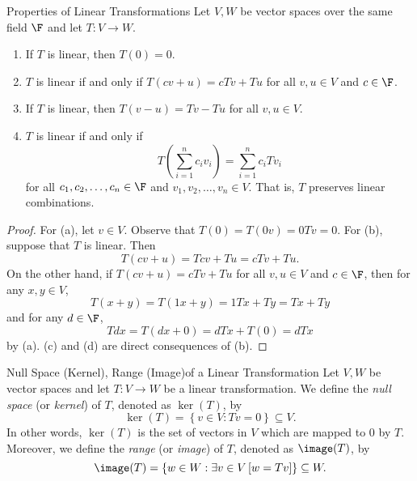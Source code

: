 \documentclass[linearalgebra]{subfiles}
\begin{document}
    \begin{prop}{Properties of Linear Transformations}
        Let $V, W$ be vector spaces over the same field $\F$ and let $T:V\to W$.
        \begin{enumerate}
            \item If $T$ is linear, then $T(0)=0$.
            \item $T$ is linear if and only if $T(cv+u)=cTv+Tu$ for all $v,u\in V$ and $c\in\F$.
            \item If $T$ is linear, then $T(v-u)=Tv-Tu$ for all $v,u\in V$.
            \item $T$ is linear if and only if
                \begin{equation*}
                    T\left( \sum^{n}_{i=1} c_iv_i \right) = \sum^{n}_{i=1} c_iTv_i
                \end{equation*}
                for all $c_1,c_2,\ldots,c_n\in\F$ and $v_1,v_2,\ldots,v_n\in V$. That is, $T$ preserves linear combinations.
        \end{enumerate}
    \end{prop}

    \begin{proof}
        For (a), let $v\in V$. Observe that $T(0) = T(0v) = 0Tv = 0$. For (b), suppose that $T$ is linear. Then
        \begin{equation*}
            T(cv+u) = Tcv + Tu = cTv + Tu.
        \end{equation*}
        On the other hand, if $T(cv+u) = cTv+Tu$ for all $v,u\in V$ and $c\in\F$, then for any $x,y\in V$,
        \begin{equation*}
            T(x+y) = T(1x+y) = 1Tx+Ty = Tx+Ty
        \end{equation*}
        and for any $d\in\F$,
        \begin{equation*}
            Tdx = T(dx+0) = dTx + T(0) = dTx
        \end{equation*}
        by (a). (c) and (d) are direct consequences of (b).
    \end{proof}

    \begin{definition}{Null Space (Kernel), Range (Image)}{of a Linear Transformation}
        Let $V, W$ be vector spaces and let $T:V\to W$ be a linear transformation. We define the \emph{null space} (or \emph{kernel}) of $T$, denoted as $\ker(T)$, by
        \begin{equation*}
            \ker(T) = \left\lbrace v\in V: Tv=0 \right\rbrace \subseteq V.
        \end{equation*}
        In other words, $\ker(T)$ is the set of vectors in $V$ which are mapped to 0 by $T$. Moreover, we define the \emph{range} (or \emph{image}) of $T$, denoted as $\image(T)$, by
        \begin{equation*}
            \image(T) = \left\lbrace w\in W: \exists v\in V\left[ w=Tv \right] \right\rbrace \subseteq W.
        \end{equation*}
    \end{definition}
\end{document}
